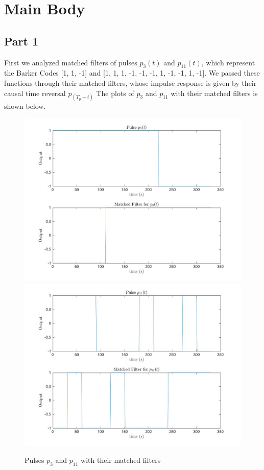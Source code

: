 \documentclass{article}
\begin{document}

\section{Main Body}

\subsection{Part 1}
First we analyzed matched filters of pulses $p_3(t)$ and $p_11(t)$, which represent the Barker Codes [1, 1, -1] and [1, 1, 1, -1, -1, -1, 1, -1, -1, 1, -1]. We passed these functions through their matched filters, whose impulse response is given by their causal time reversal $p_(T_p - t)$ The plots of $p_3$ and $p_11$ with their matched filters is shown below.
\begin{figure}[!htb]
    \centering
    \begin{minipage}{.5\textwidth}
        \centering
        \includegraphics[width=1.0\linewidth, height=0.2\textheight]{p3.jpg}
        \includegraphics[width=1\linewidth, height=0.2\textheight]{p11.jpg}
    \end{minipage}
    \caption{Pulses $p_3$ and $p_11$ with their matched filters}
\end{figure}
\end{document}
